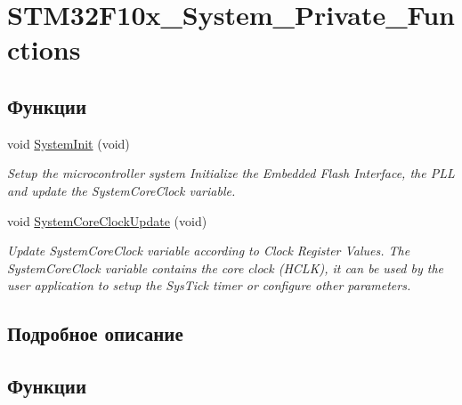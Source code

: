 \hypertarget{group___s_t_m32_f10x___system___private___functions}{}\section{S\+T\+M32\+F10x\+\_\+\+System\+\_\+\+Private\+\_\+\+Functions}
\label{group___s_t_m32_f10x___system___private___functions}
\subsection*{Функции}
\begin{DoxyCompactItemize}
\item 
void \mbox{\hyperlink{group___s_t_m32_f10x___system___private___functions_ga93f514700ccf00d08dbdcff7f1224eb2}{System\+Init}} (void)
\begin{DoxyCompactList}\small\item\em Setup the microcontroller system Initialize the Embedded Flash Interface, the P\+LL and update the System\+Core\+Clock variable. \end{DoxyCompactList}\item 
void \mbox{\hyperlink{group___s_t_m32_f10x___system___private___functions_gae0c36a9591fe6e9c45ecb21a794f0f0f}{System\+Core\+Clock\+Update}} (void)
\begin{DoxyCompactList}\small\item\em Update System\+Core\+Clock variable according to Clock Register Values. The System\+Core\+Clock variable contains the core clock (H\+C\+LK), it can be used by the user application to setup the Sys\+Tick timer or configure other parameters. \end{DoxyCompactList}\end{DoxyCompactItemize}


\subsection{Подробное описание}


\subsection{Функции}
\mbox{\label{group___s_t_m32_f10x___system___private___functions_gae0c36a9591fe6e9c45ecb21a794f0f0f}} 
